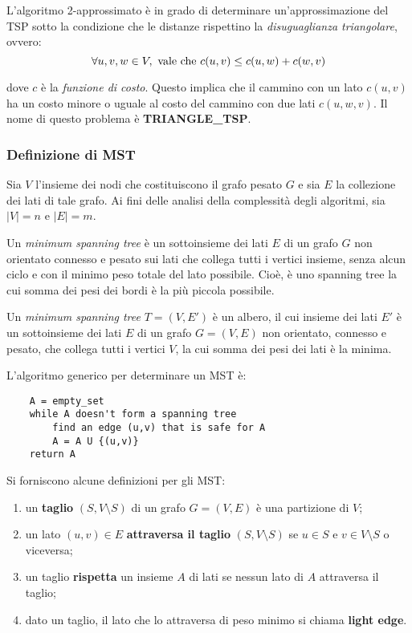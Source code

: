L'algoritmo 2-approssimato è in grado di determinare un'approssimazione del TSP sotto la condizione che le
distanze rispettino la \textit{disuguaglianza triangolare}, ovvero:
\begin{equation}
    \forall u, v, w \in V, \textnormal{ vale che } c(u, v) \le c(u, w) + c(w, v)
\end{equation}

dove $c$ è la \textit{funzione di costo}. Questo implica che il cammino con un lato $c(u, v)$ ha un costo
minore o uguale al costo del cammino con due lati $c(u, w, v)$. Il nome di questo problema è \textbf{TRIANGLE\_TSP}.

\subsubsection{Definizione di MST}

Sia $V$ l'insieme dei nodi che costituiscono il grafo pesato $G$ e sia $E$ la collezione dei lati di tale
grafo. Ai fini delle analisi della complessità degli algoritmi, sia $|V| = n$ e $|E| = m$.

Un \textit{minimum spanning tree} è un
sottoinsieme dei lati $E$ di un grafo $G$ non orientato connesso e pesato sui lati che
collega tutti i vertici insieme, senza alcun ciclo e con il minimo peso totale del
lato possibile. Cioè, è uno spanning tree la cui somma dei pesi dei bordi è la più
piccola possibile.

Un \textit{minimum spanning tree} $T = (V, E')$ è un albero, il cui insieme dei lati $E'$ è un
sottoinsieme dei lati $E$ di un grafo $G = (V, E)$ non orientato, connesso e
pesato, che collega tutti i vertici $V$, la cui somma dei pesi dei lati è la minima.

L'algoritmo generico per determinare un MST è:
\begin{verbatim}
    A = empty_set
    while A doesn't form a spanning tree
        find an edge (u,v) that is safe for A
        A = A U {(u,v)}
    return A
\end{verbatim}

Si forniscono alcune definizioni per gli MST:
\begin{enumerate}
    \item un \textbf{taglio} $(S, V \setminus S)$ di un grafo $G = (V, E)$ è una partizione
    di $V$;
    \item un lato $(u, v) \in E$ \textbf{attraversa il taglio} $(S, V \setminus S)$ se
    $u \in S$ e $v \in V \setminus S$ o viceversa;
    \item un taglio \textbf{rispetta} un insieme $A$ di lati se nessun lato di $A$ attraversa
    il taglio;
    \item dato un taglio, il lato che lo attraversa di peso minimo si chiama \textbf{light edge}.
\end{enumerate}

